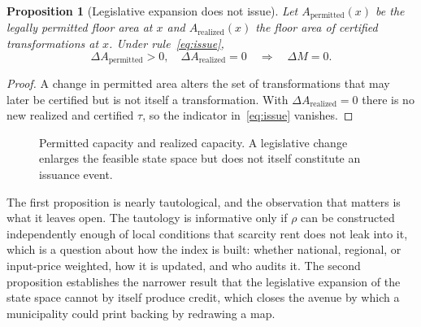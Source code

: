 \documentclass[11pt]{article}
\newtheorem{proposition}{Proposition}
\theoremstyle{definition}
\begin{document}
\begin{proposition}[Legislative expansion does not issue]
Let $A_{\mathrm{permitted}}(x)$ be the legally permitted floor area at $x$ and $A_{\mathrm{realized}}(x)$ the floor area of certified transformations at $x$. Under rule~\eqref{eq:issue},
\[
\Delta A_{\mathrm{permitted}}>0,\quad \Delta A_{\mathrm{realized}}=0 \quad\Longrightarrow\quad \Delta M=0 .
\]
\end{proposition}

\begin{proof}
A change in permitted area alters the set of transformations that may later be certified but is not itself a transformation. With $\Delta A_{\mathrm{realized}}=0$ there is no new realized and certified $\tau$, so the indicator in~\eqref{eq:issue} vanishes.
\end{proof}

\begin{figure}[htbp]
\centering
{}
\caption{Permitted capacity and realized capacity. A legislative change enlarges the feasible state space but does not itself constitute an issuance event.}
\label{fig:permitted-realized}
\end{figure}


The first proposition is nearly tautological, and the observation that matters is what it leaves open. The tautology is informative only if $\rho$ can be constructed independently enough of local conditions that scarcity rent does not leak into it, which is a question about how the index is built: whether national, regional, or input-price weighted, how it is updated, and who audits it. The second proposition establishes the narrower result that the legislative expansion of the state space cannot by itself produce credit, which closes the avenue by which a municipality could print backing by redrawing a map.
\end{document}
